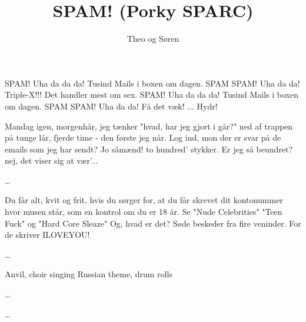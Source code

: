 \documentclass[danish]{article}
\title{SPAM! (Porky SPARC)}
\author{Theo og Søren}
\begin{document}
\begin{song}


 SPAM! Uha da da da!
 Tusind Mails i boxen om dagen.
 SPAM SPAM! Uha da da!
 Triple-X!!! Det handler mest om sex.
 SPAM! Uha da da da!
 Tusind Mails i boxen om dagen.
 SPAM SPAM! Uha da da!
 Få det væk! ... Hydr! 

 Mandag igen, morgenhår, jeg
 tænker "hvad, har jeg gjort i går?"
 ned af trappen på tunge lår,
 fjerde time - den første jeg når.
 Log ind, mon der er svar
 på de emails som jeg har
 sendt? Jo såmænd!
 to hundred' stykker.
 Er jeg så beundret?
 nej, det viser sig at vær'...

 \ldots

 Du får alt, kvit og frit, hvis du
 sørger for, at du får skrevet dit
 kontonummer hvor musen står,
 som en kontrol om du er 18 år. 
 Se "Nude Celebrities"
 "Teen Fuck" og "Hard Core Sleaze"
 Og, hvad er det?
 Søde beskeder
 fra fire veninder.
 For de skriver ILOVEYOU!

 \ldots

\scene Anvil, choir singing Russian theme, drum rolls

 \ldots

 \ldots

\end{song}
\end{document}
